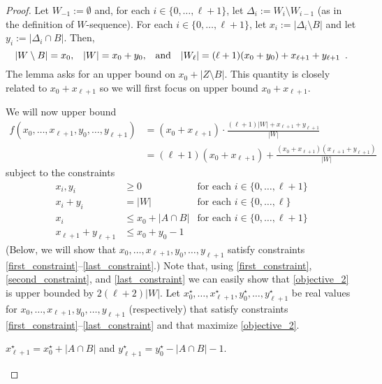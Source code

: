 \documentclass{patmorin}
\begin{document}
\begin{proof}
  Let $W_{-1}:=\emptyset$ and, for each $i\in\{0,\ldots,\ell+1\}$, let $\Delta_{i}:=W_{i}\setminus W_{i-1}$ (as in the definition of $W$-sequence).
  For each $i\in\{0,\ldots,\ell+1\}$, let $x_i:=|\Delta_i\setminus B|$ and let $y_i:=|\Delta_i\cap B|$.  Then,
  \[
    |W\setminus B|=x_0
    \text{,}\quad
    |W| = x_0+y_0
    \text{,\quad and}\quad
    |W_\ell|=(\ell+1)(x_0+y_0)+x_{\ell+1}+y_{\ell+1} \enspace .
  \]
  The lemma asks for an upper bound on $x_0+|Z\setminus B|$. This quantity is closely related to $x_0+x_{\ell+1}$ so we will first focus on upper bound $x_0+x_{\ell+1}$.

  We will now upper bound
  \begin{align}
    f(x_0,\ldots,x_{\ell+1},y_0,\ldots,y_{\ell+1})
    & = (x_0+x_{\ell+1})\cdot\frac{(\ell+1)|W|+x_{\ell+1}+y_{\ell+1}}{|W|} \label{objective_1} \\
    & = (\ell+1)(x_0+x_{\ell+1})+\frac{(x_0+x_{\ell+1})(x_{\ell+1}+y_{\ell+1})}{|W|} \label{objective_2}
  \end{align}
  subject to the constraints
  \begin{align}
      x_i,y_i & \ge 0 & \text{for each $i\in\{0,\ldots,\ell+1\}$} \label{first_constraint}  \\
      x_i+y_i & =|W| & \text{for each $i\in\{0,\ldots,\ell\}$}\label{second_constraint}  \\
      x_i & \le x_0+|A\cap B| & \text{for each $i\in\{0,\ldots,\ell+1\}$} \label{third_constraint}  \\
      x_{\ell+1}+y_{\ell+1} & \le x_0+y_0-1  \label{last_constraint}
  \end{align}
  (Below, we will show that $x_0,\ldots,x_{\ell+1},y_0,\ldots,y_{\ell+1}$ satisfy constraints \eqref{first_constraint}--\eqref{last_constraint}.)
  Note that, using \eqref{first_constraint}, \eqref{second_constraint}, and \eqref{last_constraint} we can easily show that \eqref{objective_2} is upper bounded by $2(\ell+2)|W|$.  Let $x_0^\star,\ldots,x_{\ell+1}^\star,y_0^\star,\ldots,y_{\ell+1}^\star$ be real values for $x_0,\ldots,x_{\ell+1},y_0,\ldots,y_{\ell+1}$ (respectively) that satisfy constraints \eqref{first_constraint}--\eqref{last_constraint} and that maximize \eqref{objective_2}.

  \begin{clm}\label{optimal_choices}
    $x_{\ell+1}^\star = x_0^\star+|A\cap B|$ and $y_{\ell+1}^\star = y_0^\star-|A\cap B|-1$.
  \end{clm}


\end{proof}
\end{document}
